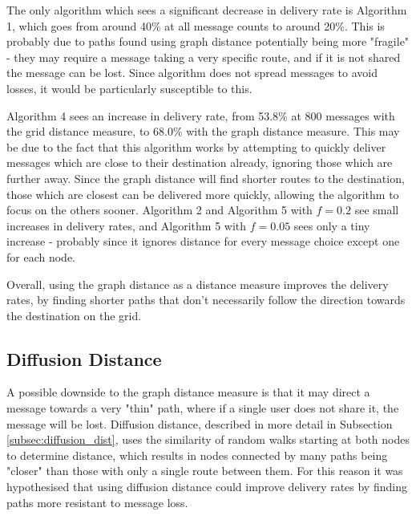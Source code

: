 \documentclass[bsc,frontabs,twoside,singlespacing,parskip,deptreport]{infthesis}     %
\begin{document}
The only algorithm which sees a significant decrease in delivery rate is Algorithm 1, which goes from around 40\% at all message counts to around 20\%. This is probably due to paths found using graph distance potentially being more "fragile" - they may require a message taking a very specific route, and if it is not shared the message can be lost. Since algorithm does not spread messages to avoid losses, it would be particularly susceptible to this.

Algorithm 4 sees an increase in delivery rate, from 53.8\% at 800 messages with the grid distance measure, to 68.0\% with the graph distance measure. This may be due to the fact that this algorithm works by attempting to quickly deliver messages which are close to their destination already, ignoring those which are further away. Since the graph distance will find shorter routes to the destination, those which are closest can be delivered more quickly, allowing the algorithm to focus on the others sooner. Algorithm 2 and Algorithm 5 with $f=0.2$ see small increases in delivery rates, and Algorithm 5 with $f=0.05$ sees only a tiny increase - probably since it ignores distance for every message choice except one for each node.

Overall, using the graph distance as a distance measure improves the delivery rates, by finding shorter paths that don't necessarily follow the direction towards the destination on the grid.

\subsection{Diffusion Distance}
A possible downside to the graph distance measure is that it may direct a message towards a very "thin" path, where if a single user does not share it, the message will be lost. Diffusion distance, described in more detail in Subsection \ref{subsec:diffusion_dist}, uses the similarity of random walks starting at both nodes to determine distance, which results in nodes connected by many paths being "closer" than those with only a single route between them. For this reason it was hypothesised that using diffusion distance could improve delivery rates by finding paths more resistant to message loss.
\end{document}
